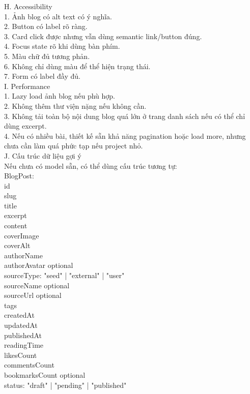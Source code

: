 \begin{enumerate}
H. Accessibility \\

1. Ảnh blog có alt text có ý nghĩa. \\
2. Button có label rõ ràng. \\
3. Card click được nhưng vẫn dùng semantic link/button đúng. \\
4. Focus state rõ khi dùng bàn phím. \\
5. Màu chữ đủ tương phản. \\
6. Không chỉ dùng màu để thể hiện trạng thái. \\
7. Form có label đầy đủ. \\

I. Performance \\

1. Lazy load ảnh blog nếu phù hợp. \\
2. Không thêm thư viện nặng nếu không cần. \\
3. Không tải toàn bộ nội dung blog quá lớn ở trang danh sách nếu có thể chỉ dùng excerpt. \\
4. Nếu có nhiều bài, thiết kế sẵn khả năng pagination hoặc load more, nhưng chưa cần làm quá phức tạp nếu project nhỏ. \\

J. Cấu trúc dữ liệu gợi ý \\
Nếu chưa có model sẵn, có thể dùng cấu trúc tương tự: \\

BlogPost: \\
\* id \\
\* slug \\
\* title \\
\* excerpt \\
\* content \\
\* coverImage \\
\* coverAlt \\
\* authorName \\
\* authorAvatar optional \\
\* sourceType: "seed" | "external" | "user" \\
\* sourceName optional \\
\* sourceUrl optional \\
\* tags \\
\* createdAt \\
\* updatedAt \\
\* publishedAt \\
\* readingTime \\
\* likesCount \\
\* commentsCount \\
\* bookmarksCount optional \\
\* status: "draft" | "pending" | "published" \\



\end{enumerate}
